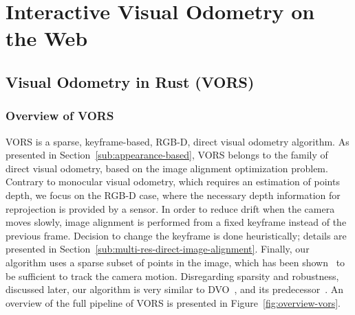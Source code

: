 \chapter{Interactive Visual Odometry on the Web}%
\label{cha:interactive_vo_on_the_web}

\minitoc%
\clearpage

\section{Visual Odometry in Rust (VORS)}%
\label{sec:vors}

\subsection{Overview of VORS}%
\label{sub:vors-overview}

VORS is a sparse, keyframe-based, RGB-D, direct visual odometry algorithm.
As presented in Section~\ref{sub:appearance-based},
VORS belongs to the family of direct visual odometry,
based on the image alignment optimization problem.
Contrary to monocular visual odometry, which requires an estimation
of points depth, we focus on the RGB-D case,
where the necessary depth information for reprojection is provided by a sensor.
In order to reduce drift when the camera moves slowly,
image alignment is performed from a fixed keyframe instead of the previous frame.
Decision to change the keyframe is done heuristically;
details are presented in Section~\ref{sub:multi-res-direct-image-alignment}.
Finally, our algorithm uses a sparse subset of points in the image,
which has been shown~\cite{engel2017direct} to be sufficient to track the camera motion.
Disregarding sparsity and robustness, discussed later,
our algorithm is very similar to DVO~\cite{kerl2013robust},
and its predecessor~\cite{steinbrucker2011real}.
An overview of the full pipeline of VORS is presented in Figure~\ref{fig:overview-vors}.

